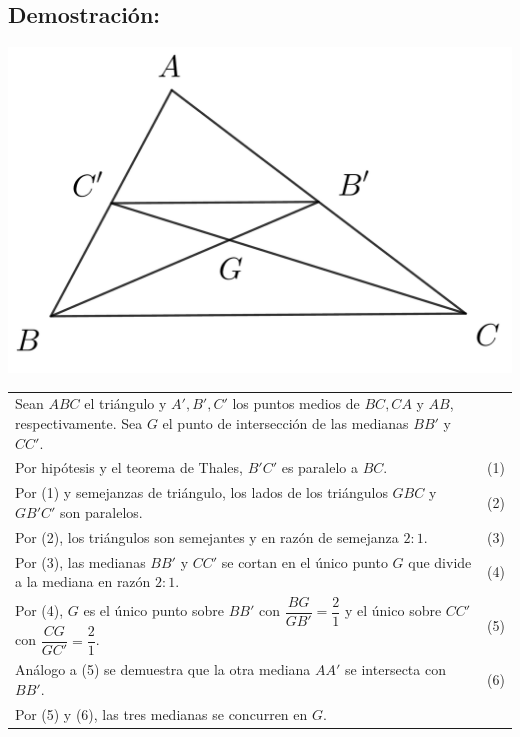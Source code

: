 \documentclass[12pt,a4paper]{article}
\begin{document}
\subsection*{Demostración:}
\begin{center}
\includegraphics[scale=0.8]{Imagenes/medianas.png} 
\end{center}
\begin{tabular}{p{15.9 cm} p{1cm}}
Sean $ABC$ el triángulo y $A', B', C'$ los puntos medios de $BC, CA$ y $AB$, respectivamente. Sea $G$ el punto de intersección de las medianas $BB'$ y $CC'$. 
\\Por hipótesis y el teorema de Thales, $B'C'$ es paralelo a $BC$. &(1)
\\Por (1) y semejanzas de triángulo, los lados de los triángulos $GBC$ y $GB'C'$ son paralelos. &(2)
\\Por (2), los triángulos son semejantes y en razón de semejanza $2:1.$ &(3)
\\Por (3), las medianas $BB'$  y $CC'$ se cortan en el único punto $G$ que divide a la mediana en razón $2:1$. &\medskip(4)
\\Por (4), $G$ es el único punto sobre $BB'$ con $\dfrac{BG}{GB'}=\dfrac{2}{1}$ y el único sobre $CC'$ con $\dfrac{CG}{GC'}=\dfrac{2}{1}$. &(5)
\\Análogo a (5) se demuestra que la otra mediana $AA'$ se intersecta con $BB'$. &(6)
\\Por (5) y (6), las tres medianas se concurren en $G$.
\end{tabular}
\end{document}
